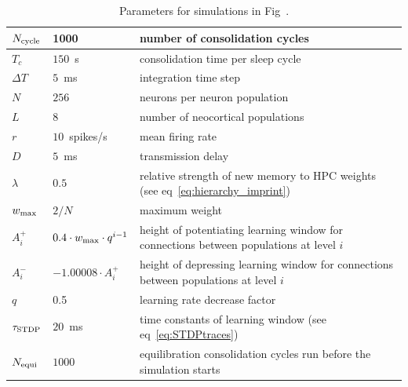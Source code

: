 \begin{table}[!ht]
\centering
\renewcommand{\arraystretch}{1.2}
    \begin{tabularx}{\textwidth}{| l | l | X |}
      \hline
      $N_{\rm cycle}$ & 1000 & number of consolidation cycles \\ \hline
      $T_c$ & $150$~s & consolidation time per sleep cycle \\ \hline
      $\Delta T$ & $5$~ms & integration time step \\ \hline
      $N$ & $256$ & neurons per neuron population \\ \hline
      $L$ & $8$ & number of neocortical populations \\ \hline
      $r$ & $10$~spikes/s & mean firing rate \\ \hline
      $D$ & $5$~ms & transmission delay \\ \hline
      $\lambda$ & $0.5$ & relative strength of new memory to HPC weights (see eq~\ref{eq:hierarchy_imprint}) \\ \hline
      $w_{\rm max}$ & $2 / N$ & maximum weight \\ \hline
      $A_i^+$ & $0.4 \cdot w_{\rm max} \cdot q^{i-1}$ & height of potentiating learning window for connections between populations at level $i$ \\ \hline
      $A_i^-$ & $-1.00008 \cdot A_i^+$ & height of depressing learning window for connections between populations at level $i$ \\ \hline
      $q$ & 0.5 & learning rate decrease factor \\ \hline
      $\tau_{\rm STDP}$ & $20$~ms & time constants of learning window (see eq~\ref{eq:STDPtraces}) \\ \hline
      $N_{\rm equi}$ & $1000$ & equilibration consolidation cycles run before the simulation starts \\ \hline
    \end{tabularx}
\caption{Parameters for simulations in Fig~\protect{\ref{fig:hierarchical}}.}
\label{tab:hierarchy}
\end{table}

